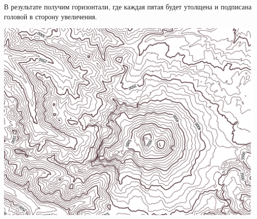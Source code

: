 \documentclass[
]{book}
\begin{document}
В результате получим горизонтали, где каждая пятая будет утолщена и подписана головой в сторону увеличения.

\includegraphics{figures/94.PNG}
\end{document}
